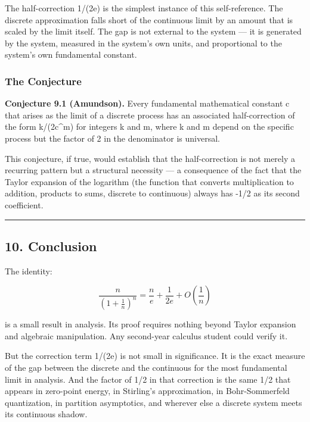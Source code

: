 \documentclass[
]{article}
\begin{document}
The half-correction 1/(2e) is the simplest instance of this
self-reference. The discrete approximation falls short of the continuous
limit by an amount that is scaled by the limit itself. The gap is not
external to the system --- it is generated by the system, measured in
the system's own units, and proportional to the system's own fundamental
constant.

\subsubsection{The Conjecture}\label{the-conjecture}

\textbf{Conjecture 9.1 (Amundson).} Every fundamental mathematical
constant c that arises as the limit of a discrete process has an
associated half-correction of the form k/(2c\^{}m) for integers k and m,
where k and m depend on the specific process but the factor of 2 in the
denominator is universal.

This conjecture, if true, would establish that the half-correction is
not merely a recurring pattern but a structural necessity --- a
consequence of the fact that the Taylor expansion of the logarithm (the
function that converts multiplication to addition, products to sums,
discrete to continuous) always has -1/2 as its second coefficient.

\begin{center}\rule{0.5\linewidth}{0.5pt}\end{center}

\subsection{10. Conclusion}\label{conclusion}

The identity:

\[\frac{n}{\left(1 + \frac{1}{n}\right)^n} = \frac{n}{e} + \frac{1}{2e} + O\!\left(\frac{1}{n}\right)\]

is a small result in analysis. Its proof requires nothing beyond Taylor
expansion and algebraic manipulation. Any second-year calculus student
could verify it.

But the correction term 1/(2e) is not small in significance. It is the
exact measure of the gap between the discrete and the continuous for the
most fundamental limit in analysis. And the factor of 1/2 in that
correction is the same 1/2 that appears in zero-point energy, in
Stirling's approximation, in Bohr-Sommerfeld quantization, in partition
asymptotics, and wherever else a discrete system meets its continuous
shadow.
\end{document}
